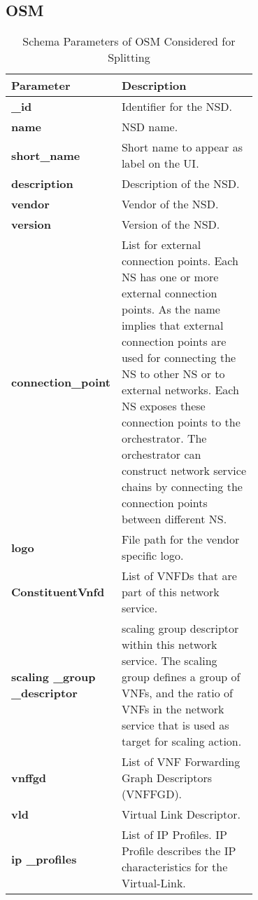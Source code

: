 \subsection{OSM}
\begin{table}[htbp] \cite{OSMSchemaDocumentation}
	\begin{center}
		\caption{Schema Parameters of OSM Considered for Splitting}
		\label{tab:table2}
			\begin{tabular}{|l|p{0.7\linewidth}|}
			\textbf{Parameter} & \textbf{Description} \\
			\hline
			\textbf{\_id} & Identifier for the NSD. \\ 
			\textbf{name} & NSD name. \\
			\textbf{short\_name} & Short name to appear as label on the UI. \\
			\textbf{description} & Description of the NSD. \\
			\textbf{vendor} & Vendor of the NSD. \\
			\textbf{version} & Version of the NSD. \\
			\textbf{connection\_point} & List for external connection points.
Each NS has one or more external connection
points. As the name implies that external
connection points are used for connecting
the NS to other NS or to external networks.
Each NS exposes these connection points to
the orchestrator. The orchestrator can
construct network service chains by
connecting the connection points between
different NS. \\
			\textbf{logo} & File path for the vendor specific logo. \\
			\textbf{ConstituentVnfd} & List of VNFDs that are part of this
network service. \\
			\textbf{scaling \_group \_descriptor} & scaling group descriptor within this network service.
The scaling group defines a group of VNFs,
and the ratio of VNFs in the network service
that is used as target for scaling action. \\
			\textbf{vnffgd} & List of VNF Forwarding Graph Descriptors (VNFFGD). \\
			\textbf{vld} & Virtual Link Descriptor. \\
			\textbf{ip \_profiles} & List of IP Profiles.
  IP Profile describes the IP characteristics for the Virtual-Link. \\
		\end{tabular}
	\end{center}
\end{table}
